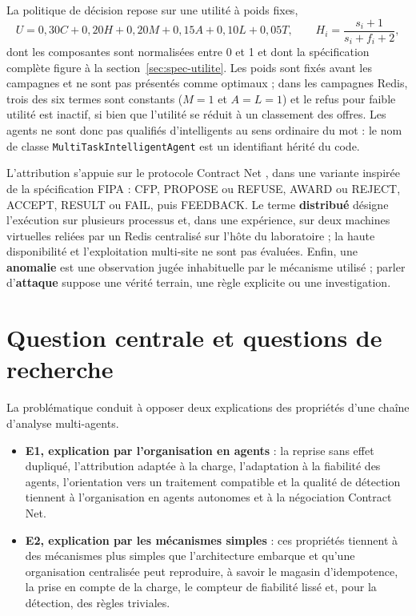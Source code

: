 La politique de décision repose sur une utilité à poids fixes,
\[
U = 0{,}30C + 0{,}20H + 0{,}20M + 0{,}15A + 0{,}10L + 0{,}05T,
\qquad H_i = \frac{s_i+1}{s_i+f_i+2},
\]
dont les composantes sont normalisées entre 0 et 1 et dont la spécification complète figure à la section~\ref{sec:spec-utilite}. Les poids sont fixés avant les campagnes et ne sont pas présentés comme optimaux ; dans les campagnes Redis, trois des six termes sont constants ($M=1$ et $A=L=1$) et le refus pour faible utilité est inactif, si bien que l'utilité se réduit à un classement des offres. Les agents ne sont donc pas qualifiés d'intelligents au sens ordinaire du mot : le nom de classe \texttt{MultiTaskIntelligentAgent} est un identifiant hérité du code.

L'attribution s'appuie sur le protocole Contract Net \cite{smith1980contract}, dans une variante inspirée de la spécification FIPA \cite{fipa2002contractnet} : CFP, PROPOSE ou REFUSE, AWARD ou REJECT, ACCEPT, RESULT ou FAIL, puis FEEDBACK. Le terme \textbf{distribué} désigne l'exécution sur plusieurs processus et, dans une expérience, sur deux machines virtuelles reliées par un Redis centralisé sur l'hôte du laboratoire ; la haute disponibilité et l'exploitation multi-site ne sont pas évaluées. Enfin, une \textbf{anomalie} est une observation jugée inhabituelle par le mécanisme utilisé ; parler d'\textbf{attaque} suppose une vérité terrain, une règle explicite ou une investigation.


\section*{Question centrale et questions de recherche}


La problématique conduit à opposer deux explications des propriétés d'une chaîne d'analyse multi-agents.
\begin{itemize}
    \item \textbf{E1, explication par l'organisation en agents} : la reprise sans effet dupliqué, l'attribution adaptée à la charge, l'adaptation à la fiabilité des agents, l'orientation vers un traitement compatible et la qualité de détection tiennent à l'organisation en agents autonomes et à la négociation Contract Net.
    \item \textbf{E2, explication par les mécanismes simples} : ces propriétés tiennent à des mécanismes plus simples que l'architecture embarque et qu'une organisation centralisée peut reproduire, à savoir le magasin d'idempotence, la prise en compte de la charge, le compteur de fiabilité lissé et, pour la détection, des règles triviales.
\end{itemize}

